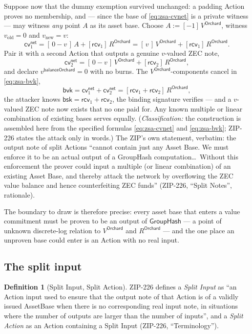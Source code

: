 \documentclass[11pt,a4paper]{article}
\theoremstyle{definition}
\newtheorem{definition}[theorem]{Definition}
\newcommand{\cvsym}{\mathsf{cv}}
\newcommand{\GroupHash}{\ensuremath{\mathsf{GroupHash}}}
\newcommand{\rcv}{\ensuremath{\mathsf{rcv}}}
\begin{document}
Suppose now that the dummy exemption survived unchanged: a padding Action
proves no membership, and --- since the base of \eqref{eq:zsa-cvnet} is a
private witness --- may witness \emph{any} point $A$ as its asset base.
Choose $A := [-1]\,V^{\mathsf{Orchard}}$, witness $v_{\mathrm{old}} = 0$
and $v_{\mathrm{new}} = v$:
\[
\cvsym^{\mathsf{net}}_{1} = [\,0 - v\,]\,A + [\rcv_1]\,R^{\mathsf{Orchard}}
= [\,v\,]\,V^{\mathsf{Orchard}} + [\rcv_1]\,R^{\mathsf{Orchard}}.
\]
Pair it with a second Action that outputs a genuine $v$-valued ZEC note,
\[
\cvsym^{\mathsf{net}}_{2} = [\,0 - v\,]\,V^{\mathsf{Orchard}}
+ [\rcv_2]\,R^{\mathsf{Orchard}},
\]
and declare $v^{\mathsf{balanceOrchard}} = 0$ with no burns. The
$V^{\mathsf{Orchard}}$-components cancel in \eqref{eq:zsa-bvk},
\[
\mathsf{bvk} = \cvsym^{\mathsf{net}}_{1} + \cvsym^{\mathsf{net}}_{2}
= [\rcv_1 + \rcv_2]\,R^{\mathsf{Orchard}},
\]
the attacker knows $\mathsf{bsk} = \rcv_1 + \rcv_2$, the binding signature
verifies --- and a $v$-valued ZEC note now exists that no one paid for. Any
known multiple or linear combination of existing bases serves equally.
(\emph{Classification:} the construction is assembled here from the
specified formulas \eqref{eq:zsa-cvnet} and \eqref{eq:zsa-bvk}; ZIP-226
states the attack only in words.) The ZIP's own statement, verbatim: the
output note of split Actions ``cannot contain just any Asset Base. We must
enforce it to be an actual output of a GroupHash computation\dots\ Without
this enforcement the prover could input a multiple (or linear combination)
of an existing Asset Base, and thereby attack the network by overflowing
the ZEC value balance and hence counterfeiting ZEC funds'' (ZIP-226,
``Split Notes'', rationale).

The boundary to draw is therefore precise: every asset base that enters a
value commitment must be proven to be an output of $\GroupHash$ --- a point
of unknown discrete-log relation to $V^{\mathsf{Orchard}}$ and
$R^{\mathsf{Orchard}}$ --- and the one place an unproven base could enter
is an Action with no real input.

\subsection{The split input}\label{sec:zsa-split-input}

\begin{definition}[Split Input, Split Action]\label{def:zsa-split-input}
ZIP-226 defines a \emph{Split Input} as ``an Action input used to ensure
that the output note of that Action is of a validly issued AssetBase when
there is no corresponding real input note, in situations where the number
of outputs are larger than the number of inputs'', and a \emph{Split
Action} as an Action containing a Split Input (ZIP-226, ``Terminology'').
\end{definition}
\end{document}
